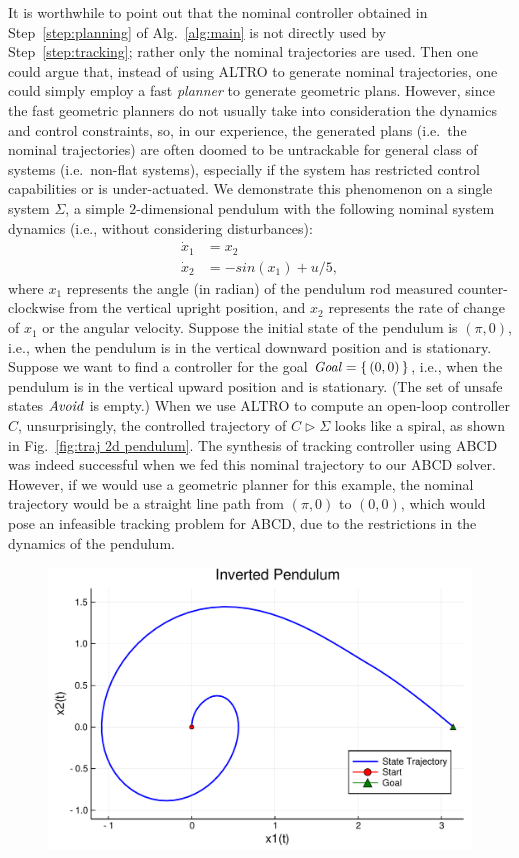 \begin{remark}
	It is worthwhile to point out that the nominal controller obtained in Step~\ref{step:planning} of Alg.~\ref{alg:main} is not directly used by Step~\ref{step:tracking}; rather only the nominal trajectories are used.
	Then one could argue that, instead of using ALTRO to generate nominal trajectories, one could simply employ a fast \emph{planner} \cite{Kavraki1996rrt} to generate geometric plans.
	However, since the fast geometric planners do not usually take into consideration the dynamics and control constraints, so, in our experience, the generated plans (i.e.\ the nominal trajectories) are often doomed to be untrackable for general class of systems (i.e.\ non-flat systems), especially if the system has restricted control capabilities or is under-actuated.
	We demonstrate this phenomenon on a single system $\Sigma$, a simple $2$-dimensional pendulum with the following nominal system dynamics (i.e., without considering disturbances):
	\begin{align*}
		\dot{x}_1 &= x_2\\
		\dot{x}_2 &= -sin(x_1) + u/5,
	\end{align*}
	where $x_1$ represents the angle (in radian) of the pendulum rod measured counter-clockwise from the vertical upright position, and $x_2$ represents the rate of change of $x_1$ or the angular velocity.
	Suppose the initial state of the pendulum is $(\pi,0)$, i.e., when the pendulum is in the vertical downward position and is stationary.
	Suppose we want to find a controller for the goal $\mathit{Goal} = \set{(0,0)}$, i.e., when the pendulum is in the vertical upward position and is stationary.
	(The set of unsafe states $\mathit{Avoid}$ is empty.)
	When we use ALTRO to compute an open-loop controller $C$, unsurprisingly, the controlled trajectory of $C\triangleright \Sigma$ looks like a spiral, as shown in Fig.~\ref{fig:traj 2d pendulum}.
	The synthesis of tracking controller using ABCD was indeed successful when we fed this nominal trajectory to our ABCD solver.
	However, if we would use a geometric planner for this example, the nominal trajectory would be a straight line path from $(\pi,0)$ to $(0,0)$, which would pose an infeasible tracking problem for ABCD, due to the restrictions in the dynamics of the pendulum.
	\begin{figure}
		\includegraphics[scale=0.2]{figures/2d_pendulum_spiral}

\end{figure}
\end{remark}
